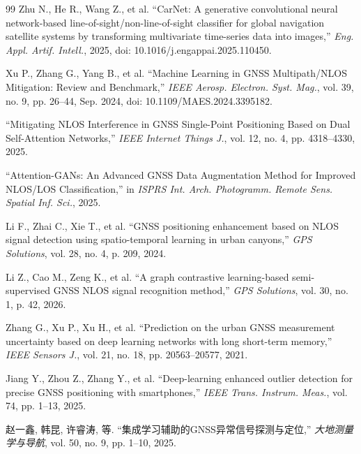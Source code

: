 \begin{thebibliography}{99}
 Zhu N., He R., Wang Z., et al. ``CarNet: A generative convolutional neural network-based line-of-sight/non-line-of-sight classifier for global navigation satellite systems by transforming multivariate time-series data into images,'' \textit{Eng. Appl. Artif. Intell.}, 2025, doi: 10.1016/j.engappai.2025.110450.

 Xu P., Zhang G., Yang B., et al. ``Machine Learning in GNSS Multipath/NLOS Mitigation: Review and Benchmark,'' \textit{IEEE Aerosp. Electron. Syst. Mag.}, vol. 39, no. 9, pp. 26--44, Sep. 2024, doi: 10.1109/MAES.2024.3395182.

 ``Mitigating NLOS Interference in GNSS Single-Point Positioning Based on Dual Self-Attention Networks,'' \textit{IEEE Internet Things J.}, vol. 12, no. 4, pp. 4318--4330, 2025.

 ``Attention-GANs: An Advanced GNSS Data Augmentation Method for Improved NLOS/LOS Classification,'' in \textit{ISPRS Int. Arch. Photogramm. Remote Sens. Spatial Inf. Sci.}, 2025.

 Li F., Zhai C., Xie T., et al. ``GNSS positioning enhancement based on NLOS signal detection using spatio-temporal learning in urban canyons,'' \textit{GPS Solutions}, vol. 28, no. 4, p. 209, 2024.

 Li Z., Cao M., Zeng K., et al. ``A graph contrastive learning-based semi-supervised GNSS NLOS signal recognition method,'' \textit{GPS Solutions}, vol. 30, no. 1, p. 42, 2026.

 Zhang G., Xu P., Xu H., et al. ``Prediction on the urban GNSS measurement uncertainty based on deep learning networks with long short-term memory,'' \textit{IEEE Sensors J.}, vol. 21, no. 18, pp. 20563--20577, 2021.

 Jiang Y., Zhou Z., Zhang Y., et al. ``Deep-learning enhanced outlier detection for precise GNSS positioning with smartphones,'' \textit{IEEE Trans. Instrum. Meas.}, vol. 74, pp. 1--13, 2025.

 赵一鑫, 韩昆, 许睿涛, 等. ``集成学习辅助的GNSS异常信号探测与定位,'' \textit{大地测量学与导航}, vol. 50, no. 9, pp. 1--10, 2025.

\end{thebibliography}
